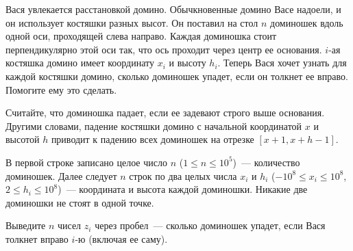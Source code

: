 
\Legend
Вася увлекается расстановкой домино. Обычкновенные домино Васе надоели, и он использует костяшки разных высот.
Он поставил на стол $n$ доминошек вдоль одной оси, проходящей слева направо. Каждая доминошка стоит
перпендикулярно этой оси так, что ось проходит через центр ее основания. $i$-ая костяшка домино имеет координату
$x_i$ и высоту $h_i$. Теперь Вася хочет узнать для каждой костяшки домино, сколько доминошек упадет, если он
толкнет ее вправо. Помогите ему это сделать.

Считайте, что доминошка падает, если ее задевают строго выше основания. Другими словами, падение костяшки домино
с начальной координатой $x$ и высотой $h$ приводит к падению всех доминошек на отрезке $[x + 1, x + h - 1]$.

\Input
В первой строке записано целое число $n$ ($1 \le n \le 10^5$)~--- количество доминошек. Далее следует $n$ строк
по два целых числа $x_i$ и $h_i$ ($-10^8 \le x_i \le 10^8$, $2 \le h_i \le 10^8$)~--- координата и высота каждой
доминошки. Никакие две доминошки не стоят в одной точке.

\Output
Выведите $n$ чисел $z_i$ через пробел~--- сколько доминошек упадет, если Вася толкнет вправо $i$-ю (включая ее саму).

\Samples
\BeginTests
{}
\EndTests

\EndProblem
